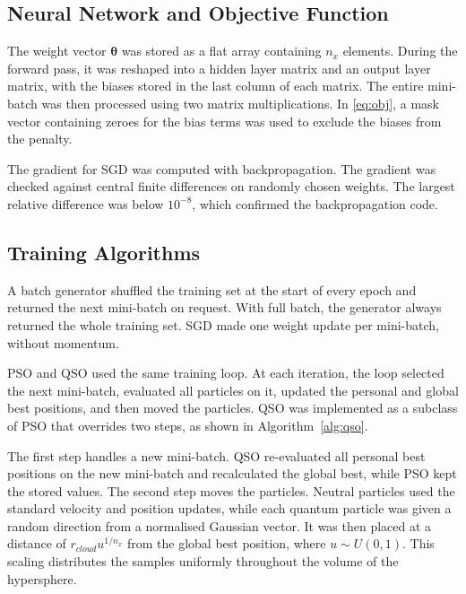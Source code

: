 \documentclass[conference]{IEEEtran}
\begin{document}
\subsection{Neural Network and Objective Function}
The weight vector $\boldsymbol{\theta}$ was stored as a flat array 
containing $n_x$ elements. During the forward pass, it was reshaped into a 
hidden layer matrix and an output layer matrix, with the biases stored in 
the last column of each matrix. The entire mini-batch was then processed 
using two matrix multiplications. In \eqref{eq:obj}, a mask vector containing 
zeroes for the bias terms was used to exclude the biases from the penalty.

The gradient for SGD was computed with backpropagation. The gradient
was checked against central finite differences on randomly chosen
weights. The largest relative difference was below $10^{-8}$, which
confirmed the backpropagation code.

\subsection{Training Algorithms}
A batch generator shuffled the training set at the start of every
epoch and returned the next mini-batch on request. With full batch,
the generator always returned the whole training set. SGD made one
weight update per mini-batch, without momentum.

PSO and QSO used the same training loop. At each iteration, the loop selected 
the next mini-batch, evaluated all particles on it, updated the personal and 
global best positions, and then moved the particles. QSO was implemented as a 
subclass of PSO that overrides two steps, as shown in Algorithm~\ref{alg:qso}.

The first step handles a new mini-batch. QSO re-evaluated all personal best 
positions on the new mini-batch and recalculated the global best, while PSO 
kept the stored values. The second step moves the particles. Neutral particles 
used the standard velocity and position updates, while each quantum particle 
was given a random direction from a normalised Gaussian vector. It was then 
placed at a distance of $r_{cloud} u^{1/n_x}$ from the global best position, 
where $u \sim U(0,1)$. This scaling distributes the samples uniformly 
throughout the volume of the hypersphere.
\end{document}
